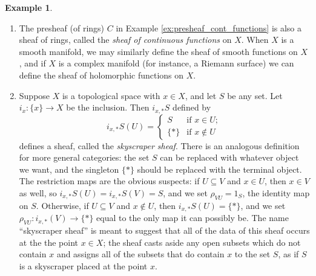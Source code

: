\documentclass[10pt,oneside]{book}
\theoremstyle{plain}
\theoremstyle{definition}
\newtheorem{ex}[thm]{Example}
\theoremstyle{remark}
\numberwithin{equation}{section}
\numberwithin{figure}{section}
\begin{document}
\begin{ex}
\hfill
\begin{enumerate}[label=(\roman*)]
    \item The presheaf (of rings) $C$ in Example \ref{ex:presheaf_cont_functions} is also a sheaf of rings, called the \emph{sheaf of continuous functions} on $X$. When $X$ is a smooth manifold, we may similarly define the sheaf of smooth functions on $X$, and if $X$ is a complex manifold (for instance, a Riemann surface) we can define the sheaf of holomorphic functions on $X$. 

    \item Suppose $X$ is a topological space with $x \in X$, and let $S$ be any set. Let $i_x: \{x\} \to X$ be the inclusion. Then $i_{x, *}S$ defined by
    \[i_{x, *}S(U) = \begin{cases} S & \text{if } x \in U;\\
                            \{\ast\} & \text{if } x \not \in U
                     \end{cases}\]
    defines a sheaf, called the \emph{skyscraper sheaf}. There is an analogous definition for more general categories: the set $S$ can be replaced with whatever object we want, and the singleton $\{\ast\}$ should be replaced with the terminal object. The restriction maps are the obvious suspects: if $U \subseteq V$ and $x \in U$, then $x \in V$ as well, so $i_{x, *}S(U) = i_{x, *}S(V) = S$, and we set $\rho_{VU} = 1_S$, the identity map on $S$. Otherwise, if $U \subseteq V$ and $x \not \in U$, then $i_{x, *}S(U) = \{\ast\}$, and we set $\rho_{VU}: i_{x, *}(V) \to \{\ast\}$ equal to the only map it can possibly be. The name ``skyscraper sheaf'' is meant to suggest that all of the data of this sheaf occurs at the the point $x \in X$; the sheaf casts aside any open subsets which do not contain $x$ and assigns all of the subsets that do contain $x$ to the set $S$, as if $S$ is a skyscraper placed at the point $x$. 
\end{enumerate}
\end{ex}
\end{document}
